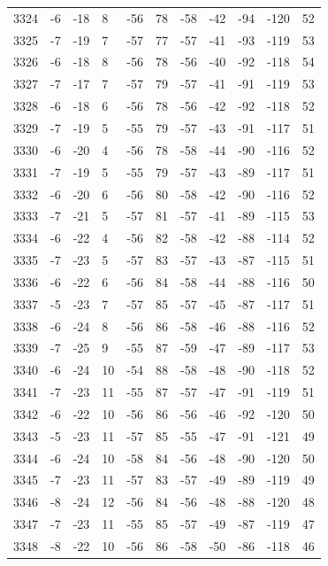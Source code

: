 \begin{table}[H]
\begin{tabular}{lllllllllll}
3324 & -6 & -18 & 8 & -56 & 78 & -58 & -42 & -94 & -120 & 52 \\
3325 & -7 & -19 & 7 & -57 & 77 & -57 & -41 & -93 & -119 & 53 \\
3326 & -6 & -18 & 8 & -56 & 78 & -56 & -40 & -92 & -118 & 54 \\
3327 & -7 & -17 & 7 & -57 & 79 & -57 & -41 & -91 & -119 & 53 \\
3328 & -6 & -18 & 6 & -56 & 78 & -56 & -42 & -92 & -118 & 52 \\
3329 & -7 & -19 & 5 & -55 & 79 & -57 & -43 & -91 & -117 & 51 \\
3330 & -6 & -20 & 4 & -56 & 78 & -58 & -44 & -90 & -116 & 52 \\
3331 & -7 & -19 & 5 & -55 & 79 & -57 & -43 & -89 & -117 & 51 \\
3332 & -6 & -20 & 6 & -56 & 80 & -58 & -42 & -90 & -116 & 52 \\
3333 & -7 & -21 & 5 & -57 & 81 & -57 & -41 & -89 & -115 & 53 \\
3334 & -6 & -22 & 4 & -56 & 82 & -58 & -42 & -88 & -114 & 52 \\
3335 & -7 & -23 & 5 & -57 & 83 & -57 & -43 & -87 & -115 & 51 \\
3336 & -6 & -22 & 6 & -56 & 84 & -58 & -44 & -88 & -116 & 50 \\
3337 & -5 & -23 & 7 & -57 & 85 & -57 & -45 & -87 & -117 & 51 \\
3338 & -6 & -24 & 8 & -56 & 86 & -58 & -46 & -88 & -116 & 52 \\
3339 & -7 & -25 & 9 & -55 & 87 & -59 & -47 & -89 & -117 & 53 \\
3340 & -6 & -24 & 10 & -54 & 88 & -58 & -48 & -90 & -118 & 52 \\
3341 & -7 & -23 & 11 & -55 & 87 & -57 & -47 & -91 & -119 & 51 \\
3342 & -6 & -22 & 10 & -56 & 86 & -56 & -46 & -92 & -120 & 50 \\
3343 & -5 & -23 & 11 & -57 & 85 & -55 & -47 & -91 & -121 & 49 \\
3344 & -6 & -24 & 10 & -58 & 84 & -56 & -48 & -90 & -120 & 50 \\
3345 & -7 & -23 & 11 & -57 & 83 & -57 & -49 & -89 & -119 & 49 \\
3346 & -8 & -24 & 12 & -56 & 84 & -56 & -48 & -88 & -120 & 48 \\
3347 & -7 & -23 & 11 & -55 & 85 & -57 & -49 & -87 & -119 & 47 \\
3348 & -8 & -22 & 10 & -56 & 86 & -58 & -50 & -86 & -118 & 46 \\

\end{tabular}
\end{table}
